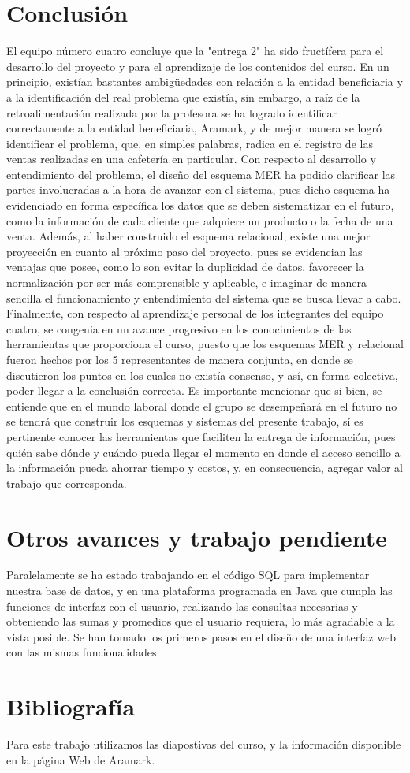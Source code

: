 \documentclass[12pt]{article}
\begin{document}
	\section{Conclusi\'on}
	El equipo n\'umero cuatro concluye que la "entrega 2" ha sido fruct\'ifera para el desarrollo del proyecto y para el aprendizaje de los contenidos del curso.
	 En un principio, exist\'ian bastantes ambig\"uedades con relaci\'on a la entidad beneficiaria y a la identificaci\'on del real problema que exist\'ia, sin embargo, a ra\'iz de la retroalimentaci\'on realizada por la profesora se ha logrado identificar correctamente a la entidad beneficiaria, Aramark, y de mejor manera se logr\'o identificar el problema, que, en simples palabras, radica en el registro de las ventas realizadas en una cafeter\'ia en particular.
	 Con respecto al desarrollo y entendimiento del problema, el dise\~{n}o del esquema MER ha podido clarificar las partes involucradas a la hora de avanzar con el sistema, pues dicho esquema ha evidenciado en forma espec\'ifica los datos que se deben sistematizar en el futuro, como la informaci\'on de cada cliente que adquiere un producto o la fecha de una venta. Adem\'as, al haber construido el esquema relacional, existe una mejor proyecci\'on en cuanto al pr\'oximo paso del proyecto, pues se evidencian las ventajas que posee, como lo son evitar la duplicidad de datos, favorecer la normalizaci\'on por ser m\'as comprensible y aplicable, e imaginar de manera sencilla el funcionamiento y entendimiento del sistema que se busca llevar a cabo. Finalmente, con respecto al aprendizaje personal de los integrantes del equipo cuatro, se congenia en un avance progresivo en los conocimientos de las herramientas que proporciona el curso, puesto que los esquemas MER y relacional fueron hechos por los 5 representantes de manera conjunta, en donde se discutieron los puntos en los cuales no exist\'ia consenso, y as\'i, en forma colectiva, poder llegar a la conclusi\'on correcta. Es importante mencionar que si bien, se entiende que en el mundo laboral donde el grupo se desempe\~{n}ar\'a en el futuro no se tendr\'a que construir los esquemas y sistemas del presente trabajo, s\'i es pertinente conocer las herramientas que faciliten la entrega de informaci\'on, pues qui\'en sabe d\'onde y cu\'ando pueda llegar el momento en donde el acceso sencillo a la informaci\'on pueda ahorrar tiempo y costos, y, en consecuencia, agregar valor al trabajo que corresponda.
	\newpage
	\section{Otros avances y trabajo pendiente}
	Paralelamente se ha estado trabajando en el c\'odigo SQL para implementar nuestra base de datos, y en una plataforma programada en Java que cumpla las funciones de interfaz con el usuario, realizando las consultas necesarias y obteniendo las sumas y promedios que el usuario requiera, lo m\'as agradable a la vista posible. Se han tomado los primeros pasos en el dise\~{n}o de una interfaz web con las mismas funcionalidades.
	\section{Bibliograf\'ia}
	Para este trabajo utilizamos las diapostivas del curso, y la informaci\'on disponible en la p\'agina Web de Aramark.
\end{document}
